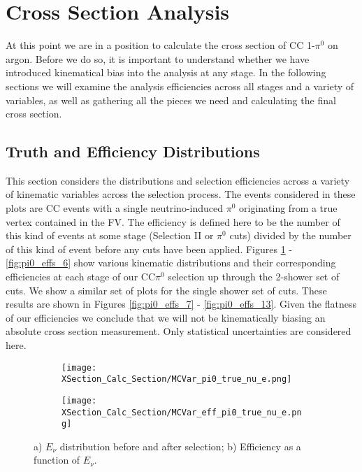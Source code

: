\documentclass{article}
\begin{document}
\clearpage
\section{Cross Section Analysis}
\par At this point we are in a position to calculate the cross section of CC 1-$\pi^0$ on argon.  Before we do so, it is important to understand whether we have introduced kinematical bias into the analysis at any stage.  In the following sections we will examine the analysis efficiencies across all stages and a variety of variables, as well as gathering all the pieces we need and calculating the final cross section.

\subsection{Truth and Efficiency Distributions}
This section considers the distributions and selection efficiencies across a variety of kinematic variables across the selection process.  The events considered in these plots are CC events with a single neutrino-induced $\pi^0$ originating from a true vertex contained in the FV. The efficiency is defined here to be the number of this kind of events at some stage (Selection II or $\pi^0$ cuts) divided by the number of this kind of event before any cuts have been applied.  Figures \ref{fig:pi0_effs_0} - \ref{fig:pi0_effs_6} show various kinematic distributions and their corresponding efficiencies at each stage of our CC$\pi^0$ selection up through the 2-shower set of cuts.  We show a similar set of plots for the single shower set of cuts.  These results are shown in Figures \ref{fig:pi0_effs_7} - \ref{fig:pi0_effs_13}. Given the flatness of our efficiencies we conclude that we will not be kinematically biasing an absolute cross section measurement. Only statistical uncertainties are considered here. 

\begin{figure}[h!]
\centering

 \begin{subfigure}[t]{0.39\textwidth}
    \centering
    \texttt{[image: XSection\_Calc\_Section/MCVar\_pi0\_true\_nu\_e.png]}
  \caption{ }
  \end{subfigure} 
  \hspace{20mm}
  \begin{subfigure}[t]{0.39\textwidth}
    \centering
\texttt{[image: XSection\_Calc\_Section/MCVar\_eff\_pi0\_true\_nu\_e.png]}
  \caption{ }
  \end{subfigure} 
\caption{a) $E_\nu$ distribution before and after selection; b) Efficiency as a function of $E_\nu$. }
\label{fig:pi0_effs_0}
\end{figure}
\end{document}
